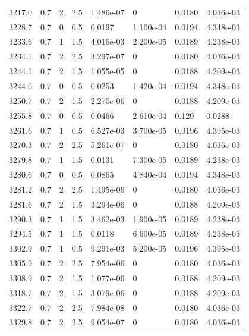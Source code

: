 \documentclass[preview]{standalone}
\begin{document}
{{{{{{{{{{{{\begin{tabular}{L{1.2cm}C{1.2cm} C{0.3cm}C{0.5cm} C{1.4cm}C{1.4cm} C{1.4cm}C{1.4cm}}
  3217.0  &   0.7  & 2     & 2.5 &  1.486e-07  & 0  & 0.0180 &  4.036e-03   \\ 
  3228.7  &   0.7  & 0     & 0.5 &  0.0197  & 1.100e-04  & 0.0194 &  4.348e-03   \\ 
  3233.6  &   0.7  & 1     & 1.5 &  4.016e-03  & 2.200e-05  & 0.0189 &  4.238e-03   \\ 
  3234.1  &   0.7  & 2     & 2.5 &  3.297e-07  & 0  & 0.0180 &  4.036e-03   \\ 
  3244.1  &   0.7  & 2     & 1.5 &  1.055e-05  & 0  & 0.0188 &  4.209e-03   \\ 
  3244.6  &   0.7  & 0     & 0.5 &  0.0253  & 1.420e-04  & 0.0194 &  4.348e-03   \\ 
  3250.7  &   0.7  & 2     & 1.5 &  2.270e-06  & 0  & 0.0188 &  4.209e-03   \\ 
  3255.8  &   0.7  & 0     & 0.5 &  0.0466  & 2.610e-04  & 0.129 &  0.0288   \\ 
  3261.6  &   0.7  & 1     & 0.5 &  6.527e-03  & 3.700e-05  & 0.0196 &  4.395e-03   \\ 
  3270.3  &   0.7  & 2     & 2.5 &  5.261e-07  & 0  & 0.0180 &  4.036e-03   \\ 
  3279.8  &   0.7  & 1     & 1.5 &  0.0131  & 7.300e-05  & 0.0189 &  4.238e-03   \\ 
  3280.6  &   0.7  & 0     & 0.5 &  0.0865  & 4.840e-04  & 0.0194 &  4.348e-03   \\ 
  3281.2  &   0.7  & 2     & 2.5 &  1.495e-06  & 0  & 0.0180 &  4.036e-03   \\ 
  3281.6  &   0.7  & 2     & 1.5 &  3.294e-06  & 0  & 0.0188 &  4.209e-03   \\ 
  3290.3  &   0.7  & 1     & 1.5 &  3.462e-03  & 1.900e-05  & 0.0189 &  4.238e-03   \\ 
  3294.5  &   0.7  & 1     & 1.5 &  0.0118  & 6.600e-05  & 0.0189 &  4.238e-03   \\ 
  3302.9  &   0.7  & 1     & 0.5 &  9.291e-03  & 5.200e-05  & 0.0196 &  4.395e-03   \\ 
  3305.9  &   0.7  & 2     & 2.5 &  7.954e-06  & 0  & 0.0180 &  4.036e-03   \\ 
  3308.9  &   0.7  & 2     & 1.5 &  1.077e-06  & 0  & 0.0188 &  4.209e-03   \\ 
  3318.7  &   0.7  & 2     & 1.5 &  3.079e-06  & 0  & 0.0188 &  4.209e-03   \\ 
  3322.7  &   0.7  & 2     & 2.5 &  7.984e-08  & 0  & 0.0180 &  4.036e-03   \\ 
  3329.8  &   0.7  & 2     & 2.5 &  9.054e-07  & 0  & 0.0180 &  4.036e-03   \\ 

\end{tabular}}}}}}}}}}}}}
\end{document}
